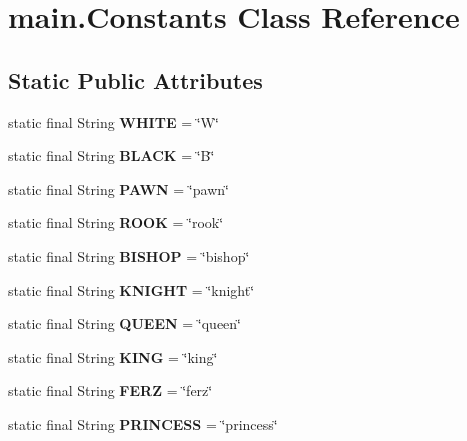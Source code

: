 \hypertarget{classmain_1_1_constants}{}\section{main.\+Constants Class Reference}
\label{classmain_1_1_constants}
\subsection*{Static Public Attributes}
\begin{DoxyCompactItemize}
\item 
\hypertarget{classmain_1_1_constants_aa6d86758a539f8c362d6c0604698544e}{}\label{classmain_1_1_constants_aa6d86758a539f8c362d6c0604698544e} 
static final String {\bfseries W\+H\+I\+TE} = \char`\"{}W\char`\"{}
\item 
\hypertarget{classmain_1_1_constants_a5be7480febe68c9cfaac6cbe99cdf690}{}\label{classmain_1_1_constants_a5be7480febe68c9cfaac6cbe99cdf690} 
static final String {\bfseries B\+L\+A\+CK} = \char`\"{}B\char`\"{}
\item 
\hypertarget{classmain_1_1_constants_a5481b648d474f7b7b4c463fe33a3098c}{}\label{classmain_1_1_constants_a5481b648d474f7b7b4c463fe33a3098c} 
static final String {\bfseries P\+A\+WN} = \char`\"{}pawn\char`\"{}
\item 
\hypertarget{classmain_1_1_constants_a35cdc603b4cd176132d80a12ed4f86d4}{}\label{classmain_1_1_constants_a35cdc603b4cd176132d80a12ed4f86d4} 
static final String {\bfseries R\+O\+OK} = \char`\"{}rook\char`\"{}
\item 
\hypertarget{classmain_1_1_constants_aba2cc5fb4d71741fd146d6b0e4d8ffc0}{}\label{classmain_1_1_constants_aba2cc5fb4d71741fd146d6b0e4d8ffc0} 
static final String {\bfseries B\+I\+S\+H\+OP} = \char`\"{}bishop\char`\"{}
\item 
\hypertarget{classmain_1_1_constants_a93770c79b6854d6f75806052bf88360a}{}\label{classmain_1_1_constants_a93770c79b6854d6f75806052bf88360a} 
static final String {\bfseries K\+N\+I\+G\+HT} = \char`\"{}knight\char`\"{}
\item 
\hypertarget{classmain_1_1_constants_a805f618dbf983c4765c4c93ffb310fbf}{}\label{classmain_1_1_constants_a805f618dbf983c4765c4c93ffb310fbf} 
static final String {\bfseries Q\+U\+E\+EN} = \char`\"{}queen\char`\"{}
\item 
\hypertarget{classmain_1_1_constants_aa5a9517d3687f8fb1fa7286efc55f253}{}\label{classmain_1_1_constants_aa5a9517d3687f8fb1fa7286efc55f253} 
static final String {\bfseries K\+I\+NG} = \char`\"{}king\char`\"{}
\item 
\hypertarget{classmain_1_1_constants_af9bdab8aecfb0d5ede3e83d25fee0e25}{}\label{classmain_1_1_constants_af9bdab8aecfb0d5ede3e83d25fee0e25} 
static final String {\bfseries F\+E\+RZ} = \char`\"{}ferz\char`\"{}
\item 
\hypertarget{classmain_1_1_constants_a28646be9e87c1093d5ba8470486ae68f}{}\label{classmain_1_1_constants_a28646be9e87c1093d5ba8470486ae68f} 
static final String {\bfseries P\+R\+I\+N\+C\+E\+SS} = \char`\"{}princess\char`\"{}
\end{DoxyCompactItemize}


